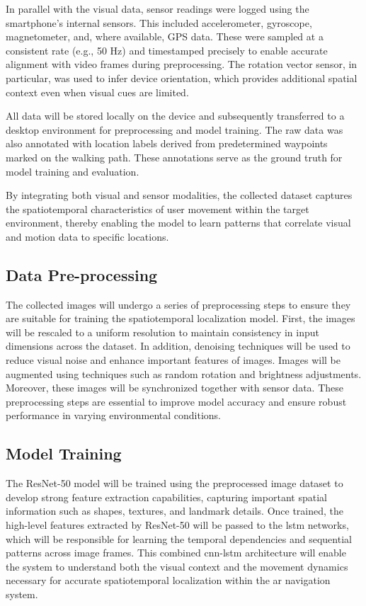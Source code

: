 \begin{refsection}
In parallel with the visual data, sensor readings were logged using the smartphone’s internal sensors. This included accelerometer, gyroscope, magnetometer, and, where available, GPS data. These were sampled at a consistent rate (e.g., 50 Hz) and timestamped precisely to enable accurate alignment with video frames during preprocessing. The rotation vector sensor, in particular, was used to infer device orientation, which provides additional spatial context even when visual cues are limited.

All data will be stored locally on the device and subsequently transferred to a desktop environment for preprocessing and model training. The raw data was also annotated with location labels derived from predetermined waypoints marked on the walking path. These annotations serve as the ground truth for model training and evaluation.

By integrating both visual and sensor modalities, the collected dataset captures the spatiotemporal characteristics of user movement within the target environment, thereby enabling the model to learn patterns that correlate visual and motion data to specific locations.

\subsection{Data Pre-processing}

The collected images will undergo a series of pre\-processing steps to ensure they are suitable for training the spatiotemporal localization model. First, the images will be rescaled to a uniform resolution to maintain consistency in input dimensions across the dataset. In addition, denoising techniques will be used to reduce visual noise and enhance important features of images. Images will be augmented using techniques such as random rotation and brightness adjustments. Moreover, these images will be synchronized together with sensor data. These pre\-processing steps are essential to improve model accuracy and ensure robust performance in varying environmental conditions.

\subsection{Model Training}

The ResNet-50 model will be trained using the preprocessed image dataset to develop strong feature extraction capabilities, capturing important spatial information such as shapes, textures, and landmark details. Once trained, the high-level features extracted by ResNet-50 will be passed to the \gls{lstm} networks, which will be responsible for learning the temporal dependencies and sequential patterns across image frames. This combined \gls{cnn}-\gls{lstm} architecture will enable the system to understand both the visual context and the movement dynamics necessary for accurate spatiotemporal localization within the \gls{ar} navigation system.


\end{refsection}
